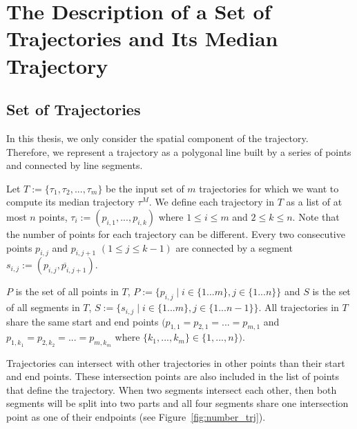 \chapter{The Description of a Set of Trajectories and Its Median Trajectory}
\label{chap:definition}

\section{Set of Trajectories}
\label{sec:setoftrjs}

In this thesis, we only consider the spatial component of the trajectory. 
Therefore, we represent a trajectory as a polygonal line built by a series of points and connected by line segments.   
 
Let $T:=\{\tau_{1},\tau_{2},...,\tau_{m}\}$ be the input set of $m$ trajectories for which we want to compute its median trajectory $\tau^{M}$.
We define each trajectory in $T$ as a list of at most $n$ points, $\tau_{i}:=(p_{i,1},...,p_{i,k})$ where $1 \leq i \leq m$ and $2 \leq k \leq n$. 
Note that the number of points for each trajectory can be different.
Every two consecutive points $p_{i,j}$ and $p_{i,j+1}$ $(1 \leq j \leq k-1)$ are connected by a segment $s_{i,j}:=(\overline{p_{i,j},p_{i,j+1}})$.

$P$ is the set of all points in $T$, $P:=\{p_{i,j} \mid i \in \{ 1 ... m\} , j \in \{ 1 ... n\} \}$ and $S$ is the set of all segments in $T$, $S:=\{s_{i,j} \mid i \in \{ 1 ... m\} , j \in \{ 1 ... n-1\} \}$.
All trajectories in $T$ share the same start and end points $(p_{1,1}=p_{2,1}=...=p_{m,1}$ and $p_{1,k_{1}}=p_{2,k_{2}}=...=p_{m,k_{m}}$ where $ \{k_{1},...,k_{m}\} \in \{1,...,n\})$. 

Trajectories can intersect with other trajectories in other points than their start and end points.
These intersection points are also included in the list of points that define the trajectory. When two segments intersect each other, then both segments will be split into two parts and all four segments share one intersection point as one of their endpoints (see Figure~\ref{fig:number_trj}).

